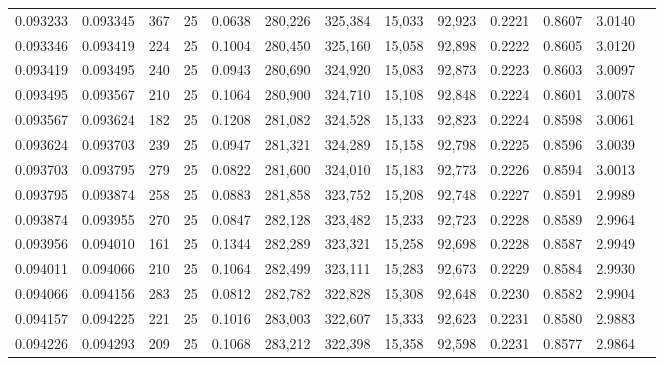 \begin{tabular}{rrrrrrrrrrrrr}
0.093233 & 0.093345 &   367 &  25 &                                     0.0638 & 280,226 & 325,384 &  15,033 &  92,923 & 0.2221 & 0.8607 & 3.0140 \\
0.093346 & 0.093419 &   224 &  25 &                                     0.1004 & 280,450 & 325,160 &  15,058 &  92,898 & 0.2222 & 0.8605 & 3.0120 \\
0.093419 & 0.093495 &   240 &  25 &                                     0.0943 & 280,690 & 324,920 &  15,083 &  92,873 & 0.2223 & 0.8603 & 3.0097 \\
0.093495 & 0.093567 &   210 &  25 &                                     0.1064 & 280,900 & 324,710 &  15,108 &  92,848 & 0.2224 & 0.8601 & 3.0078 \\
0.093567 & 0.093624 &   182 &  25 &                                     0.1208 & 281,082 & 324,528 &  15,133 &  92,823 & 0.2224 & 0.8598 & 3.0061 \\
0.093624 & 0.093703 &   239 &  25 &                                     0.0947 & 281,321 & 324,289 &  15,158 &  92,798 & 0.2225 & 0.8596 & 3.0039 \\
0.093703 & 0.093795 &   279 &  25 &                                     0.0822 & 281,600 & 324,010 &  15,183 &  92,773 & 0.2226 & 0.8594 & 3.0013 \\
0.093795 & 0.093874 &   258 &  25 &                                     0.0883 & 281,858 & 323,752 &  15,208 &  92,748 & 0.2227 & 0.8591 & 2.9989 \\
0.093874 & 0.093955 &   270 &  25 &                                     0.0847 & 282,128 & 323,482 &  15,233 &  92,723 & 0.2228 & 0.8589 & 2.9964 \\
0.093956 & 0.094010 &   161 &  25 &                                     0.1344 & 282,289 & 323,321 &  15,258 &  92,698 & 0.2228 & 0.8587 & 2.9949 \\
0.094011 & 0.094066 &   210 &  25 &                                     0.1064 & 282,499 & 323,111 &  15,283 &  92,673 & 0.2229 & 0.8584 & 2.9930 \\
0.094066 & 0.094156 &   283 &  25 &                                     0.0812 & 282,782 & 322,828 &  15,308 &  92,648 & 0.2230 & 0.8582 & 2.9904 \\
0.094157 & 0.094225 &   221 &  25 &                                     0.1016 & 283,003 & 322,607 &  15,333 &  92,623 & 0.2231 & 0.8580 & 2.9883 \\
0.094226 & 0.094293 &   209 &  25 &                                     0.1068 & 283,212 & 322,398 &  15,358 &  92,598 & 0.2231 & 0.8577 & 2.9864 \\

\end{tabular}
